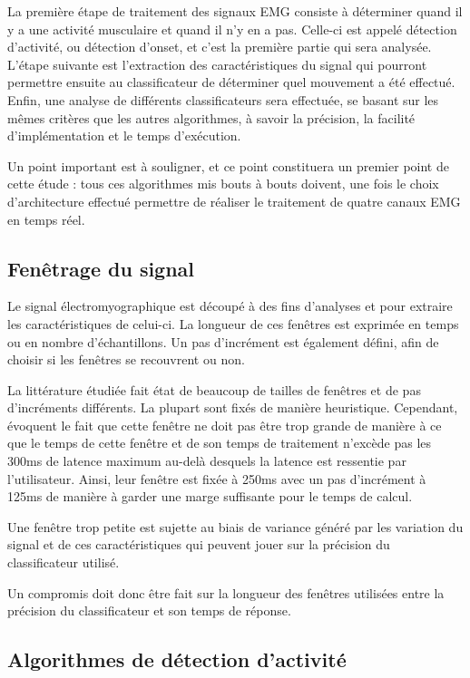 \documentclass[letterpaper, twoside, 12pt, memoire, creativecommons, hyperref]{thETS}
\begin{document}
La première étape de traitement des signaux EMG consiste à déterminer quand il y a une activité musculaire et quand il n’y en a pas. Celle-ci est appelé détection d’activité, ou détection d'onset, et c’est la première partie qui sera analysée. L’étape suivante est l’extraction des caractéristiques du signal qui pourront permettre ensuite au classificateur de déterminer quel mouvement a été effectué. Enfin, une analyse de différents classificateurs sera effectuée, se basant sur les mêmes critères que les autres algorithmes, à savoir la précision, la facilité d’implémentation et le temps d’exécution. 

Un point important est à souligner, et ce point constituera un premier point de cette étude : tous ces algorithmes mis bouts à bouts doivent, une fois le choix d’architecture effectué permettre de réaliser le traitement de quatre canaux EMG en temps réel.

\subsection{Fenêtrage du signal}

Le signal électromyographique est découpé à des fins d'analyses et pour extraire les caractéristiques de celui-ci. La longueur de ces fenêtres est exprimée en temps ou en nombre d'échantillons. Un pas d’incrément est également défini, afin de choisir si les fenêtres se recouvrent ou non. 

La littérature étudiée fait état de beaucoup de tailles de fenêtres et de pas d’incréments différents. La plupart sont fixés de manière heuristique. Cependant, \cite{Englehart2003} évoquent le fait que cette fenêtre ne doit pas être trop grande de manière à ce que le temps de cette fenêtre et de son temps de traitement n’excède pas les 300ms de latence maximum au-delà desquels la latence est ressentie par l’utilisateur. Ainsi, leur fenêtre est fixée à 250ms avec un pas d’incrément à 125ms de manière à garder une marge suffisante pour le temps de calcul. 

Une fenêtre trop petite est sujette au biais de variance généré par les variation du signal et de ces caractéristiques qui peuvent jouer sur la précision du classificateur utilisé.

Un compromis doit donc être fait sur la longueur des fenêtres utilisées entre la  précision du classificateur et son temps de réponse.

\subsection{Algorithmes de détection d'activité}
\end{document}
